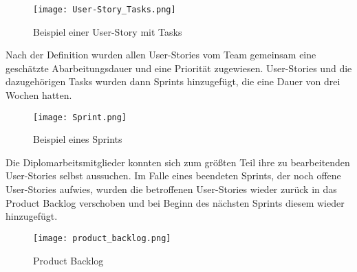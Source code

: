 		  \begin{center}
			\begin{figure}[h]
   		\centering
    	\texttt{[image: User-Story\_Tasks.png]}
		   \caption{Beispiel einer User-Story mit Tasks}
			\end{figure}
		\end{center}
		
Nach der Definition wurden allen User-Stories vom Team gemeinsam eine geschätzte Abarbeitungsdauer und eine Priorität zugewiesen.  
User-Stories und die dazugehörigen Tasks wurden dann Sprints hinzugefügt, die eine Dauer von drei Wochen hatten. 

  \begin{center}
			\begin{figure}[h]
   		\centering
    	\texttt{[image: Sprint.png]}
		   \caption{Beispiel eines Sprints}
			\end{figure}
		\end{center}

Die Diplomarbeitsmitglieder konnten sich zum größten Teil ihre zu bearbeitenden User-Stories selbst aussuchen. Im Falle eines beendeten Sprints, der noch offene User-Stories aufwies, wurden die betroffenen User-Stories wieder zurück in das Product Backlog verschoben und bei Beginn des nächsten Sprints diesem wieder hinzugefügt.

  \begin{center}
			\begin{figure}[h]
   		\centering
    	\texttt{[image: product\_backlog.png]}
		   \caption{Product Backlog}
			\end{figure}
		\end{center}
	